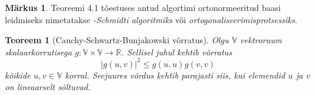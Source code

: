 \documentclass[12pt,a4paper,oneside]{article}
\theoremstyle{plain}
\newtheorem{teoreem}{Teoreem}[section]
\theoremstyle{definition}
\newtheorem{markus}{Märkus}[section]
\numberwithin{equation}{section}
\def\R{{\mathbb R}}
\def\V{{\mathbb V}}
\begin{document}
\begin{markus} \label{markus:gram-schmidt}
Teoreemi 4.1 tõestuses antud algortimi ortonormeeritud baasi 
leidmiseks nimetatakse \emph{-Schmidti algoritmiks} või 
\emph{ortogonaliseerimisprotsessiks}.
\end{markus}

\begin{teoreem}[Cauchy-Schwartz-Bunjakowski võrratus] 
\textnormal{\cite[teoreem II.1.1.]{FA2}} \label{teoreem:C-S-B}
Olgu $\V$ vektroruum skalaarkorrutisega 
$g : \V \times \V \rightarrow \R$. Sellisel juhul 
kehtib võrratus
\begin{equation} \label{eq:C-S-B}
|g\left(u, v \right)|^2 \leq g \left(u, u \right) 
g \left(v, v \right)
\end{equation}
kõikide $u, v \in \V$ korral. Seejuures võrdus kehtib parajasti 
siis, kui elemendid $u$ ja $v$ on lineaarselt sõltuvad.
\end{teoreem}
\end{document}
